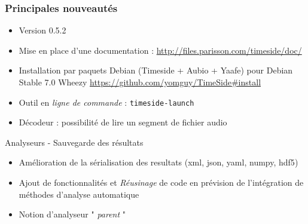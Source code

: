 \documentclass[10pt, final, hyperref, table]{beamer}
\begin{document}
\begin{frame}


  \frametitle{Principales nouveautés}
  \begin{block}{}
    \begin{itemize}
    \item Version 0.5.2
    \item Mise en place d'une documentation :
      \url{http://files.parisson.com/timeside/doc/}
   
    \item Installation par paquets Debian (Timeside + Aubio + Yaafe)
      pour Debian Stable 7.0 Wheezy
      \url{https://github.com/yomguy/TimeSide\#install}
    \item Outil en \emph{ligne de commande} : \texttt{timeside-launch}
    \item Décodeur : possibilité de lire un \alert{segment} de fichier audio
    \end{itemize}
  \end{block}
  \begin{block}{Analyseurs - Sauvegarde des résultats}
    \begin{itemize}
    \item Amélioration de la sérialisation des resultats (xml, json,
      yaml, \alert{numpy}, \alert{hdf5})
    \item  Ajout de fonctionnalités et \emph{Réusinage} de code en prévision de l'intégration de méthodes d'analyse automatique
    \item Notion d'analyseur " \emph{parent} "
    \end{itemize}
    
  \end{block}
\end{frame}
\end{document}
